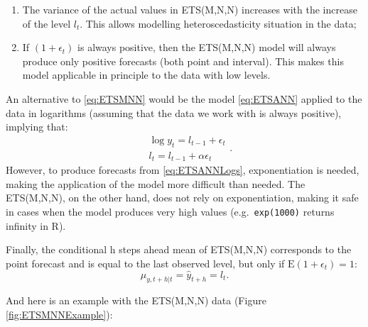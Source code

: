 \documentclass[
]{book}
\newenvironment{Shaded}{\begin{snugshade}}{\end{snugshade}}
\newcommand{\AttributeTok}[1]{\textcolor[rgb]{0.77,0.63,0.00}{#1}}
\newcommand{\ConstantTok}[1]{\textcolor[rgb]{0.00,0.00,0.00}{#1}}
\newcommand{\DecValTok}[1]{\textcolor[rgb]{0.00,0.00,0.81}{#1}}
\newcommand{\FloatTok}[1]{\textcolor[rgb]{0.00,0.00,0.81}{#1}}
\newcommand{\FunctionTok}[1]{\textcolor[rgb]{0.00,0.00,0.00}{#1}}
\newcommand{\NormalTok}[1]{#1}
\newcommand{\OtherTok}[1]{\textcolor[rgb]{0.56,0.35,0.01}{#1}}
\newcommand{\SpecialCharTok}[1]{\textcolor[rgb]{0.00,0.00,0.00}{#1}}
\newcommand{\StringTok}[1]{\textcolor[rgb]{0.31,0.60,0.02}{#1}}
\providecommand{\tightlist}{%
  \setlength{\itemsep}{0pt}\setlength{\parskip}{0pt}}
\theoremstyle{definition}
\theoremstyle{definition}
\theoremstyle{definition}
\theoremstyle{definition}
\theoremstyle{remark}
\begin{document}
\begin{enumerate}
\def\labelenumi{\arabic{enumi}.}
\tightlist
\item
  The variance of the actual values in ETS(M,N,N) increases with the increase of the level \(l_{t}\). This allows modelling heteroscedasticity situation in the data;
\item
  If \((1+\epsilon_t)\) is always positive, then the ETS(M,N,N) model will always produce only positive forecasts (both point and interval). This makes this model applicable in principle to the data with low levels.
\end{enumerate}

An alternative to \eqref{eq:ETSMNN} would be the model \eqref{eq:ETSANN} applied to the data in logarithms (assuming that the data we work with is always positive), implying that:
\begin{equation}
  \begin{aligned}
    & \log y_{t} = l_{t-1} + \epsilon_t \\
    & l_t = l_{t-1} + \alpha \epsilon_t
  \end{aligned} .
  \label{eq:ETSANNLogs}
\end{equation}
However, to produce forecasts from \eqref{eq:ETSANNLogs}, exponentiation is needed, making the application of the model more difficult than needed. The ETS(M,N,N), on the other hand, does not rely on exponentiation, making it safe in cases when the model produces very high values (e.g.~\texttt{exp(1000)} returns infinity in R).

Finally, the conditional h steps ahead mean of ETS(M,N,N) corresponds to the point forecast and is equal to the last observed level, but only if \(\mathrm{E}(1+\epsilon_t)=1\):
\begin{equation}
    \mu_{y,t+h|t} = \hat{y}_{t+h} = l_{t} .
  \label{eq:ETSMNNForecast}
\end{equation}

And here is an example with the ETS(M,N,N) data (Figure \ref{fig:ETSMNNExample}):

\begin{Shaded}
\end{Shaded}
\end{document}
